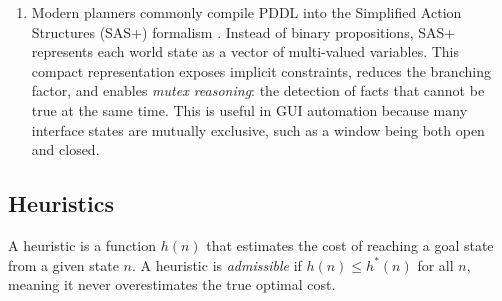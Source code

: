 \begin{enumerate}
\begin{figure}[H]
{%
}
\caption{PDDL planning workflow from Domain and Problem to an optimal action sequence.}
\label{fig:pddl_workflow}
\end{figure}

\item Modern planners commonly compile PDDL into the Simplified Action Structures (SAS+) formalism \cite{Backstrom1995}. Instead of binary propositions, SAS+ represents each world state as a vector of multi-valued variables. This compact representation exposes implicit constraints, reduces the branching factor, and enables \textit{mutex reasoning}: the detection of facts that cannot be true at the same time. This is useful in GUI automation because many interface states are mutually exclusive, such as a window being both open and closed.
\end{enumerate}

\subsection{Heuristics}
\label{subsec:planning_heuristics}

A heuristic is a function $h(n)$ that estimates the cost of reaching a goal state from a given state $n$. A heuristic is \textit{admissible} if $h(n) \leq h^*(n)$ for all $n$, meaning it never overestimates the true optimal cost.

